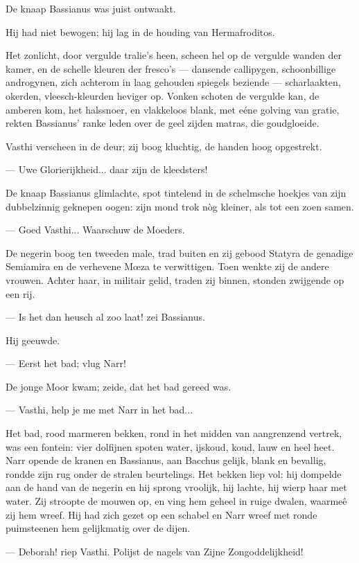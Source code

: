 \documentclass[a4paper, 12pt, oneside, dutch]{article}
\begin{document}
De knaap Bassianus was juist ontwaakt.

Hij had niet bewogen; hij lag in de houding van Hermafroditos.

Het zonlicht, door vergulde tralie's heen, scheen hel op de vergulde wanden der kamer, en de schelle kleuren der fresco's --- dansende callipygen, schoonbillige androgynen, zich achterom in laag gehouden spiegels beziende --- scharlaakten, okerden, vleesch-kleurden heviger op. Vonken schoten de vergulde kan, de amberen kom, het halssnoer, en vlakkeloos blank, met eéne golving van gratie, rekten Bassianus' ranke leden over de geel zijden matras, die goudgloeide.

Vasthi verscheen in de deur; zij boog kluchtig, de handen hoog opgestrekt.

--- Uwe Glorierijkheid... daar zijn de kleedsters!

De knaap Bassianus glimlachte, spot tintelend in de schelmsche hoekjes van zijn dubbelzinnig geknepen oogen: zijn mond trok nòg kleiner, als tot een zoen samen.

--- Goed Vasthi... Waarschuw de Moeders.

De negerin boog ten tweeden male, trad buiten en zij gebood Statyra de genadige Semiamira en de verhevene Mœza te verwittigen. Toen wenkte zij de andere vrouwen. Achter haar, in militair gelid, traden zij binnen, stonden zwijgende op een rij.

--- Is het dan heusch al zoo laat! zei Bassianus.

Hij geeuwde.

--- Eerst het bad; vlug Narr!

De jonge Moor kwam; zeide, dat het bad gereed was.

--- Vasthi, help je me met Narr in het bad...

Het bad, rood marmeren bekken, rond in het midden van aangrenzend vertrek, was een fontein: vier dolfijnen spoten water, ijskoud, koud, lauw en heel heet. Narr opende de kranen en Bassianus, aan Bacchus gelijk, blank en bevallig, rondde zijn rug onder de stralen beurtelings. Het bekken liep vol: hij dompelde aan de hand van de negerin en hij sprong vroolijk, hij lachte, hij wierp haar met water. Zij stroopte de mouwen op, en ving hem geheel in ruige dwalen, waarmeê zij hem wreef. Hij had zich gezet op een schabel en Narr wreef met ronde puimsteenen hem gelijkmatig over de dijen.

--- Deborah! riep Vasthi. Polijst de nagels van Zijne Zongoddelijkheid!
\end{document}
